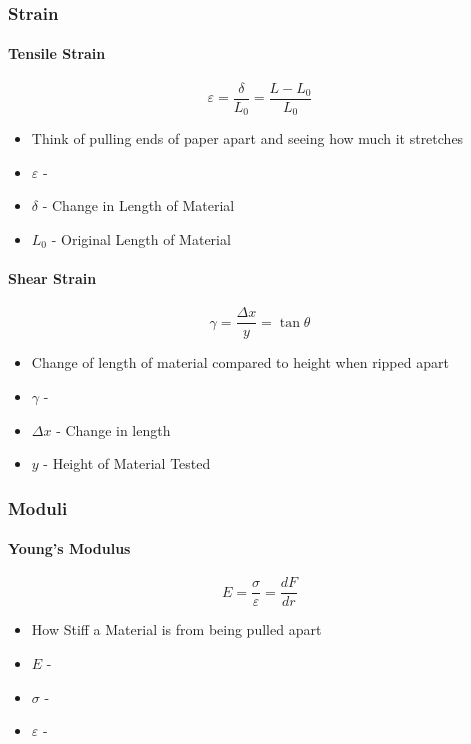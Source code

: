 		\subsubsection{Strain} \label{subsubsec:Strain}
			\paragraph{Tensile Strain} \label{par:Tensile Strain}
				\begin{equation} \label{eq:Tensile Strain}
					\varepsilon = \frac{\delta}{L_{0}} = \frac{L - L_{0}}{L_{0}}
				\end{equation}
				\begin{itemize}[noitemsep]
					\item Think of pulling ends of paper apart and seeing how much it stretches
					\item $\varepsilon$ - 
					\item $\delta$ - Change in Length of Material
					\item $L_{0}$ - Original Length of Material
				\end{itemize}
		
			\paragraph{Shear Strain} \label{par:Shear Strain}
				\begin{equation} \label{eq:Shear Strain}
					\gamma = \frac{\Delta x}{y} = \tan \theta
				\end{equation}
				\begin{itemize}[noitemsep]
					\item Change of length of material compared to height when ripped apart
					\item $\gamma$ - 
					\item $\Delta x$ - Change in length
					\item $y$ - Height of Material Tested
				\end{itemize}
		
		\subsubsection{Moduli}
			\paragraph{Young's Modulus} \label{par:Youngs Modulus}
				\begin{equation} \label{eq:Young's Modulus}
					E = \frac{\sigma}{\varepsilon} = \frac{dF}{dr}
				\end{equation}
				\begin{itemize}[noitemsep]
					\item How Stiff a Material is from being pulled apart
					\item $E$ - 
					\item $\sigma$ - 
					\item $\varepsilon$ - 
				\end{itemize}
			
